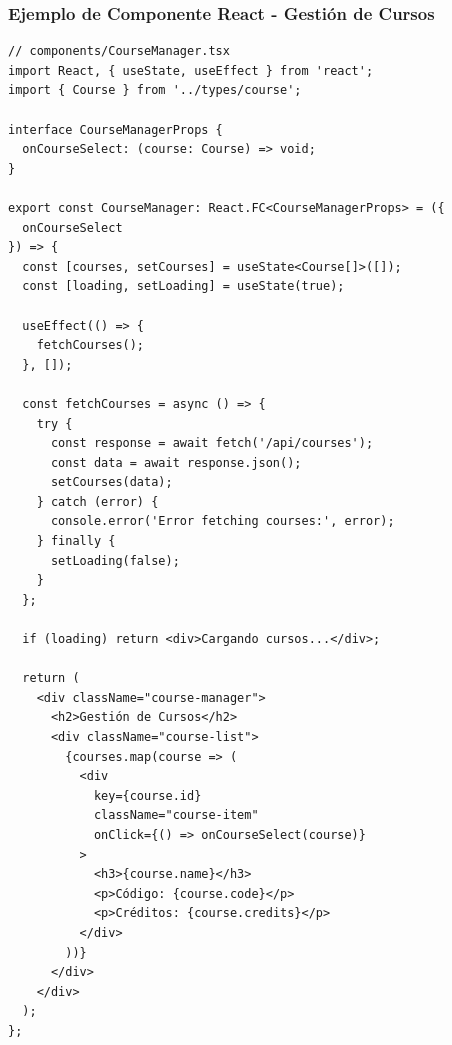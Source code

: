 \subsubsection{Ejemplo de Componente React - Gestión de Cursos}
\begin{verbatim}
// components/CourseManager.tsx
import React, { useState, useEffect } from 'react';
import { Course } from '../types/course';

interface CourseManagerProps {
  onCourseSelect: (course: Course) => void;
}

export const CourseManager: React.FC<CourseManagerProps> = ({
  onCourseSelect
}) => {
  const [courses, setCourses] = useState<Course[]>([]);
  const [loading, setLoading] = useState(true);

  useEffect(() => {
    fetchCourses();
  }, []);

  const fetchCourses = async () => {
    try {
      const response = await fetch('/api/courses');
      const data = await response.json();
      setCourses(data);
    } catch (error) {
      console.error('Error fetching courses:', error);
    } finally {
      setLoading(false);
    }
  };

  if (loading) return <div>Cargando cursos...</div>;

  return (
    <div className="course-manager">
      <h2>Gestión de Cursos</h2>
      <div className="course-list">
        {courses.map(course => (
          <div
            key={course.id}
            className="course-item"
            onClick={() => onCourseSelect(course)}
          >
            <h3>{course.name}</h3>
            <p>Código: {course.code}</p>
            <p>Créditos: {course.credits}</p>
          </div>
        ))}
      </div>
    </div>
  );
};
\end{verbatim}

